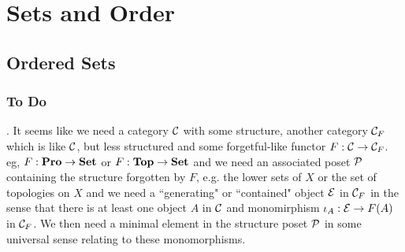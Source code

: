 \documentclass{book}
\begin{document}
	
	
	
	
	
	
	
	
	
	
	
	
	
	
	
	
	
	
	
	\part{Sets and Order}
	
	
	
	
	
	
	
	
	
	
	
	
	
	
	
	
	
	
	
	
	
	
	
	
	
	
	
	
	
	
	
	
	
	
	
	
	
	
	
	
	
	
	
	
	
	
	
	
	
	\newpage
	\chapter{Ordered Sets}
	
	\section{To Do}
	. It seems like we need a category $\mathcal{C}$ with some structure, another category $\mathcal{C}_F$ which is like $\mathcal{C}$, but less structured and some forgetful-like functor $F: \mathcal{C}\rightarrow \mathcal{C}_F$. eg, $F:\textbf{Pro} \rightarrow \operatorname*{\text{\textbf{Set}}}$ or $F:\operatorname*{\text{\textbf{Top}}} \rightarrow \operatorname*{\text{\textbf{Set}}}$ and we need an associated poset $\mathcal{P}$ containing the structure forgotten by $F$, e.g. the lower sets of $X$ or the set of topologies on $X$ and we need a ``generating" or ``contained" object $\mathcal{E}$ in $\mathcal{C}_F$ in the sense that there is at least one object $A$ in $\mathcal{C}$ and monomirphism $\iota_A: \mathcal{E} \rightarrow F(A)$ in $\mathcal{C}_F$. We then need a minimal element in the structure poset $\mathcal{P}$ in some universal sense relating to these monomorphisms. 
	
\end{document}
